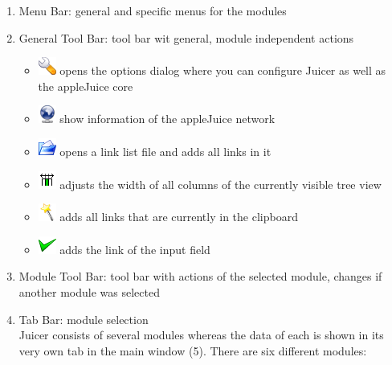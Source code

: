 \documentclass[a4paper,10pt]{book}
\begin{document}
\begin{enumerate}
 \item Menu Bar: general and specific menus for the modules
 \item General Tool Bar: tool bar wit general, module independent actions\\
 \begin{itemize}
  \item \includegraphics[width=22px]{../configure.png} opens the options dialog where you can configure Juicer as well as the appleJuice core
  \item \includegraphics[width=22px]{../network.png} show information of the appleJuice network
  \item \includegraphics[width=22px]{../fileopen.png} opens a link list file and adds all links in it
  \item \includegraphics[width=22px]{../show_table_column.png} adjusts the width of all columns of the currently visible tree view
  \item \includegraphics[width=22px]{../wizard.png} adds all links that are currently in the clipboard
  \item \includegraphics[width=22px]{../button_ok.png} adds the link of the input field
 \end{itemize}
 \item Module Tool Bar: tool bar with actions of the selected module, changes if another module was selected
 \item Tab Bar: module selection\\Juicer consists of several modules whereas the data of each is shown in its very own tab in the main window (5). There are six different modules:\\
 \begin{itemize}

\end{itemize}
\end{enumerate}
\end{document}
